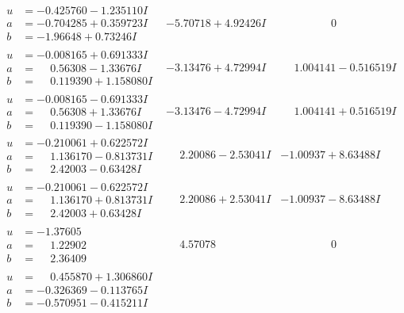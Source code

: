 \documentclass[1p]{elsarticle_modified}
\theoremstyle{definition}
\begin{document}
$$\begin{array}{c|c|c}
\begin{aligned}
u &= -0.425760 - 1.235110 I \\
a &= -0.704285 + 0.359723 I \\
b &= -1.96648 + 0.73246 I\end{aligned}
 & -5.70718 + 4.92426 I & \phantom{-0.000000 } 0 \\ \hline\begin{aligned}
u &= -0.008165 + 0.691333 I \\
a &= \phantom{-}0.56308 - 1.33676 I \\
b &= \phantom{-}0.119390 + 1.158080 I\end{aligned}
 & -3.13476 + 4.72994 I & \phantom{-}1.004141 - 0.516519 I \\ \hline\begin{aligned}
u &= -0.008165 - 0.691333 I \\
a &= \phantom{-}0.56308 + 1.33676 I \\
b &= \phantom{-}0.119390 - 1.158080 I\end{aligned}
 & -3.13476 - 4.72994 I & \phantom{-}1.004141 + 0.516519 I \\ \hline\begin{aligned}
u &= -0.210061 + 0.622572 I \\
a &= \phantom{-}1.136170 - 0.813731 I \\
b &= \phantom{-}2.42003 - 0.63428 I\end{aligned}
 & \phantom{-}2.20086 - 2.53041 I & -1.00937 + 8.63488 I \\ \hline\begin{aligned}
u &= -0.210061 - 0.622572 I \\
a &= \phantom{-}1.136170 + 0.813731 I \\
b &= \phantom{-}2.42003 + 0.63428 I\end{aligned}
 & \phantom{-}2.20086 + 2.53041 I & -1.00937 - 8.63488 I \\ \hline\begin{aligned}
u &= -1.37605\phantom{ +0.000000I} \\
a &= \phantom{-}1.22902\phantom{ +0.000000I} \\
b &= \phantom{-}2.36409\phantom{ +0.000000I}\end{aligned}
 & \phantom{-}4.57078\phantom{ +0.000000I} & \phantom{-0.000000 } 0 \\ \hline\begin{aligned}
u &= \phantom{-}0.455870 + 1.306860 I \\
a &= -0.326369 - 0.113765 I \\
b &= -0.570951 - 0.415211 I\end{aligned}

\end{array}$$
\end{document}
